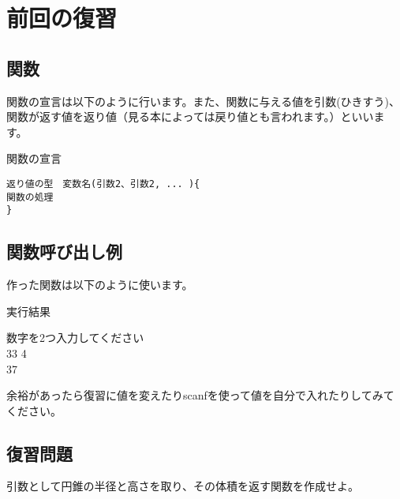 \section{前回の復習}
\subsection{関数}
関数の宣言は以下のように行います。また、関数に与える値を引数(ひきすう)、関数が返す値を返り値（見る本によっては戻り値とも言われます。）といいます。

\begin{itembox}{関数の宣言}
\begin{verbatim}
返り値の型　変数名(引数2、引数2, ... ){
関数の処理
}
\end{verbatim}
\end{itembox}

\subsection{関数呼び出し例}
作った関数は以下のように使います。

\begin{itembox}{実行結果}

数字を2つ入力してください\\
33 4\\
37
\end{itembox}
余裕があったら復習に値を変えたりscanfを使って値を自分で入れたりしてみてください。
\subsection{復習問題}
引数として円錐の半径と高さを取り、その体積を返す関数を作成せよ。
